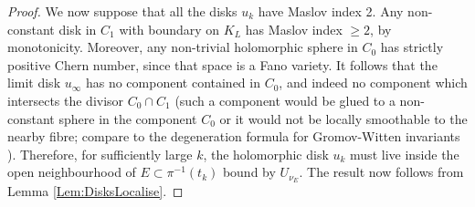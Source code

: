 \documentclass[reqno,10pt]{amsart}
\numberwithin{equation}{section}
\theoremstyle{remark}
\begin{document}
\begin{proof}
We now suppose that all the disks $u_k$ have Maslov index 2. Any non-constant disk in $C_1$ with boundary on $K_L$ has Maslov index $\geq 2$, by monotonicity.  Moreover, any non-trivial holomorphic sphere in $C_0$ has strictly positive Chern number, since that space is a Fano variety. It follows that the limit disk $u_{\infty}$ has no component contained in $C_0$, and indeed no component  which intersects the divisor $C_0 \cap C_1$ (such a component would be glued to a non-constant sphere in the component $C_0$ or it would not be locally smoothable to the nearby fibre; compare to  the degeneration formula for Gromov-Witten invariants \cite{IP}). Therefore, for sufficiently large $k$, the holomorphic disk $u_k$ must live inside the open neighbourhood of $E\subset \pi^{-1}(t_k)$ bound by $U_{\nu_E}$. 
The result now follows from Lemma \ref{Lem:DisksLocalise}.
\end{proof}
\end{document}
